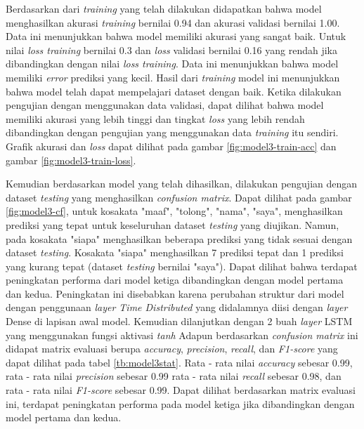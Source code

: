 Berdasarkan dari \emph{training} yang telah dilakukan didapatkan bahwa model menghasilkan akurasi \emph{training} bernilai 0.94 dan akurasi validasi bernilai 1.00. Data ini menunjukkan bahwa model memiliki akurasi yang sangat baik. Untuk nilai \emph{loss training} bernilai 0.3 dan \emph{loss} validasi bernilai 0.16 yang rendah jika dibandingkan dengan nilai \emph{loss training}. Data ini menunjukkan bahwa model memiliki \emph{error} prediksi yang kecil. Hasil dari \emph{training} model ini menunjukkan bahwa model telah dapat mempelajari dataset dengan baik. Ketika dilakukan pengujian dengan menggunakan data validasi, dapat dilihat bahwa model memiliki akurasi yang lebih tinggi dan tingkat \emph{loss} yang lebih rendah dibandingkan dengan pengujian yang menggunakan data \emph{training} itu sendiri. Grafik akurasi dan \emph{loss} dapat dilihat pada gambar \ref{fig:model3-train-acc} dan gambar \ref{fig:model3-train-loss}.


Kemudian berdasarkan model yang telah dihasilkan, dilakukan pengujian dengan dataset \emph{testing} yang menghasilkan \emph{confusion matrix}. Dapat dilihat pada gambar \ref{fig:model3-cf}, untuk kosakata "maaf", "tolong", "nama", "saya",  menghasilkan prediksi yang tepat untuk keseluruhan dataset \emph{testing} yang diujikan. Namun, pada kosakata "siapa" menghasilkan beberapa prediksi yang tidak sesuai dengan dataset \emph{testing}. Kosakata "siapa" menghasilkan 7 prediksi tepat dan 1 prediksi yang kurang tepat (dataset \emph{testing} bernilai "saya"). Dapat dilihat bahwa terdapat peningkatan performa dari model ketiga dibandingkan dengan model pertama dan kedua. Peningkatan ini disebabkan karena perubahan struktur dari model dengan penggunaan \emph{layer Time Distributed} yang didalamnya diisi dengan \emph{layer} Dense di lapisan awal model. Kemudian dilanjutkan dengan 2 buah \emph{layer} LSTM yang menggunakan fungsi aktivasi \emph{tanh} Adapun berdasarkan \emph{confusion matrix} ini didapat matrix evaluasi berupa \emph{accuracy}, \emph{precision}, \emph{recall}, dan \emph{F1-score} yang dapat dilihat pada tabel \ref{tb:model3stat}. Rata - rata nilai \emph{accuracy} sebesar 0.99, rata - rata nilai \emph{precision} sebesar 0.99 rata - rata nilai \emph{recall} sebesar 0.98, dan rata - rata nilai \emph{F1-score} sebesar 0.99. Dapat dilihat berdasarkan matrix evaluasi ini, terdapat peningkatan performa pada model ketiga jika dibandingkan dengan model pertama dan kedua.

